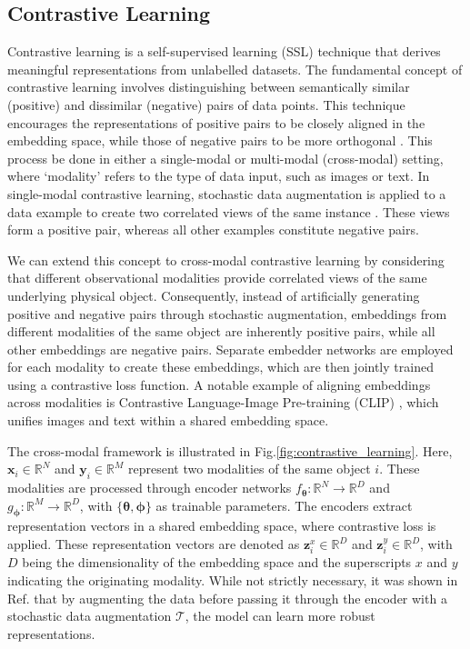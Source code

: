 \documentclass[a4paper,12pt]{article}
\begin{document}
\subsection{Contrastive Learning}
\label{sec:contrastive}
Contrastive learning is a self-supervised learning (SSL) technique that derives meaningful representations from unlabelled datasets. The fundamental concept of contrastive learning involves distinguishing between semantically similar (positive) and dissimilar (negative) pairs of data points. This technique encourages the representations of positive pairs to be closely aligned in the embedding space, while those of negative pairs to be more orthogonal \cite{chuang2020debiased}. This process be done in either a single-modal or multi-modal (cross-modal) setting, where `modality' refers to the type of data input, such as images or text. In single-modal contrastive learning, stochastic data augmentation is applied to a data example to create two correlated views of the same instance \cite{hintonsimpleframework}. These views form a positive pair, whereas all other examples constitute negative pairs. %


We can extend this concept to cross-modal contrastive learning by considering that different observational modalities provide correlated views of the same underlying physical object. Consequently, instead of artificially generating positive and negative pairs through stochastic augmentation, embeddings from different modalities of the same object are inherently positive pairs, while all other embeddings are negative pairs. Separate embedder networks are employed for each modality to create these embeddings, which are then jointly trained using a contrastive loss function. A notable example of aligning embeddings across modalities is Contrastive Language-Image Pre-training (CLIP) \cite{radford2021learning}, which unifies images and text within a shared embedding space. 



The cross-modal framework is illustrated in Fig.\ref{fig:contrastive_learning}. Here, $\mathbf{x}_i \in \mathbb{R}^N$ and $\mathbf{y}_i \in \mathbb{R}^M$ represent two modalities of the same object $i$. These modalities are processed through encoder networks $f_{\mathbf{\theta}}: \mathbb{R}^N \rightarrow \mathbb{R}^D$ and $g_{\mathbf{\phi}}: \mathbb{R}^M \rightarrow \mathbb{R}^D$, with $\{\mathbf{\theta}, \mathbf{\phi}\}$ as trainable parameters. The encoders extract representation vectors in a shared embedding space, where contrastive loss is applied. These representation vectors are denoted as $\mathbf{z}^x_i \in \mathbb{R}^D$ and $\mathbf{z}^y_i \in \mathbb{R}^D$, with $D$ being the dimensionality of the embedding space and the superscripts $x$ and $y$ indicating the originating modality. While not strictly necessary, it was shown in Ref.\cite{crossCLIP} that by augmenting the data before passing it through the encoder with a stochastic data augmentation $\mathcal{T}$, the model can learn more robust representations.
\end{document}
